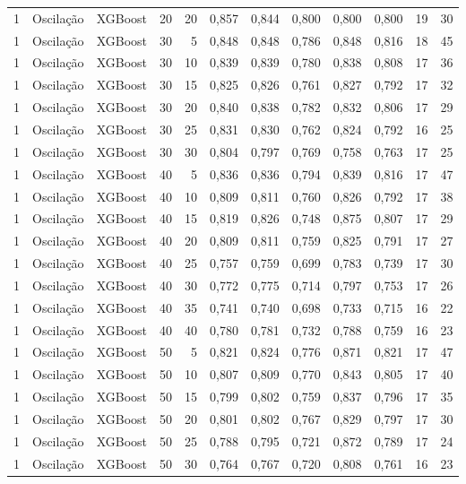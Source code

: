\begin{longtable}{@{}rllrrrrrrrrr@{}}
1 & Oscilação & XGBoost & 20 & 20 & 0,857 & 0,844 & 0,800 & 0,800 & 0,800 & 19 & 30 \\
1 & Oscilação & XGBoost & 30 & 5 & 0,848 & 0,848 & 0,786 & 0,848 & 0,816 & 18 & 45 \\
1 & Oscilação & XGBoost & 30 & 10 & 0,839 & 0,839 & 0,780 & 0,838 & 0,808 & 17 & 36 \\
1 & Oscilação & XGBoost & 30 & 15 & 0,825 & 0,826 & 0,761 & 0,827 & 0,792 & 17 & 32 \\
1 & Oscilação & XGBoost & 30 & 20 & 0,840 & 0,838 & 0,782 & 0,832 & 0,806 & 17 & 29 \\
1 & Oscilação & XGBoost & 30 & 25 & 0,831 & 0,830 & 0,762 & 0,824 & 0,792 & 16 & 25 \\
1 & Oscilação & XGBoost & 30 & 30 & 0,804 & 0,797 & 0,769 & 0,758 & 0,763 & 17 & 25 \\
1 & Oscilação & XGBoost & 40 & 5 & 0,836 & 0,836 & 0,794 & 0,839 & 0,816 & 17 & 47 \\
1 & Oscilação & XGBoost & 40 & 10 & 0,809 & 0,811 & 0,760 & 0,826 & 0,792 & 17 & 38 \\
1 & Oscilação & XGBoost & 40 & 15 & 0,819 & 0,826 & 0,748 & 0,875 & 0,807 & 17 & 29 \\
1 & Oscilação & XGBoost & 40 & 20 & 0,809 & 0,811 & 0,759 & 0,825 & 0,791 & 17 & 27 \\
1 & Oscilação & XGBoost & 40 & 25 & 0,757 & 0,759 & 0,699 & 0,783 & 0,739 & 17 & 30 \\
1 & Oscilação & XGBoost & 40 & 30 & 0,772 & 0,775 & 0,714 & 0,797 & 0,753 & 17 & 26 \\
1 & Oscilação & XGBoost & 40 & 35 & 0,741 & 0,740 & 0,698 & 0,733 & 0,715 & 16 & 22 \\
1 & Oscilação & XGBoost & 40 & 40 & 0,780 & 0,781 & 0,732 & 0,788 & 0,759 & 16 & 23 \\
1 & Oscilação & XGBoost & 50 & 5 & 0,821 & 0,824 & 0,776 & 0,871 & 0,821 & 17 & 47 \\
1 & Oscilação & XGBoost & 50 & 10 & 0,807 & 0,809 & 0,770 & 0,843 & 0,805 & 17 & 40 \\
1 & Oscilação & XGBoost & 50 & 15 & 0,799 & 0,802 & 0,759 & 0,837 & 0,796 & 17 & 35 \\
1 & Oscilação & XGBoost & 50 & 20 & 0,801 & 0,802 & 0,767 & 0,829 & 0,797 & 17 & 30 \\
1 & Oscilação & XGBoost & 50 & 25 & 0,788 & 0,795 & 0,721 & 0,872 & 0,789 & 17 & 24 \\
1 & Oscilação & XGBoost & 50 & 30 & 0,764 & 0,767 & 0,720 & 0,808 & 0,761 & 16 & 23 \\

\end{longtable}
